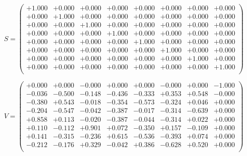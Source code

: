 \documentclass[9pt]{article}
\theoremstyle{plain}
\theoremstyle{definition}
\theoremstyle{remark}
\numberwithin{equation}{section}
\begin{document}
$S = \left(
\begin{array}{
cccccccc}
+1.000 & +0.000 & +0.000 & +0.000 & +0.000 & +0.000 & +0.000 & +0.000 \\
+0.000 & +1.000 & +0.000 & +0.000 & +0.000 & +0.000 & +0.000 & +0.000 \\
+0.000 & +0.000 & +1.000 & +0.000 & +0.000 & +0.000 & +0.000 & +0.000 \\
+0.000 & +0.000 & +0.000 & +1.000 & +0.000 & +0.000 & +0.000 & +0.000 \\
+0.000 & +0.000 & +0.000 & +0.000 & +1.000 & +0.000 & +0.000 & +0.000 \\
+0.000 & +0.000 & +0.000 & +0.000 & +0.000 & +1.000 & +0.000 & +0.000 \\
+0.000 & +0.000 & +0.000 & +0.000 & +0.000 & +0.000 & +1.000 & +0.000 \\
+0.000 & +0.000 & +0.000 & +0.000 & +0.000 & +0.000 & +0.000 & +1.000 \\
\end{array}
\right)$ \newline 

$V = \left(
\begin{array}{
cccccccc}
+0.000 & +0.000 & -0.000 & +0.000 & +0.000 & -0.000 & +0.000 & -1.000 \\
-0.036 & -0.500 & -0.148 & -0.436 & -0.333 & +0.353 & +0.548 & -0.000 \\
-0.380 & +0.543 & -0.018 & -0.354 & -0.573 & -0.324 & +0.046 & +0.000 \\
-0.204 & -0.547 & -0.042 & -0.387 & -0.017 & -0.314 & -0.639 & +0.000 \\
+0.858 & +0.113 & -0.020 & -0.387 & -0.044 & -0.314 & +0.022 & +0.000 \\
+0.110 & -0.112 & +0.901 & +0.072 & -0.350 & +0.157 & -0.109 & +0.000 \\
+0.141 & -0.315 & -0.236 & +0.615 & -0.536 & -0.393 & +0.074 & +0.000 \\
-0.212 & -0.176 & +0.329 & -0.042 & +0.386 & -0.628 & +0.520 & +0.000 \\
\end{array}
\right)$ \newline 
\end{document}

